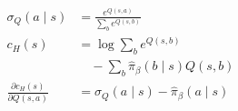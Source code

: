 \documentclass[border=7pt]{standalone}
\begin{document}
\color{ink}
$\displaystyle \begin{aligned} \sigma_Q(a\mid s)&=\frac{e^{Q(s,a)}}{\sum_b e^{Q(s,b)}}\\ c_H(s)&=\log\sum_b e^{Q(s,b)}\\ &\quad-\sum_b\widehat\pi_\beta(b\mid s)Q(s,b)\\ \frac{\partial c_H(s)}{\partial Q(s,a)}&=\sigma_Q(a\mid s)-\widehat\pi_\beta(a\mid s)\end{aligned}$
\end{document}
